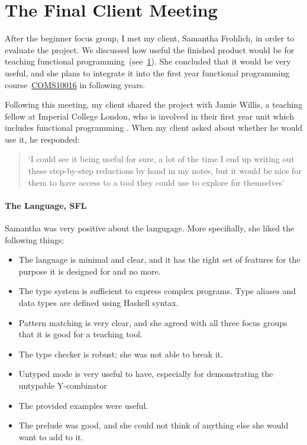 \section{The Final Client Meeting}
\label{c4:client}
After the beginner focus group, I met my client, Samantha Frohlich, in order to evaluate the project. We discussed how useful the finished product would be for teaching functional programming~(see~\ref{c4:client}). She concluded that it would be very useful, and she plans to integrate it into the first year functional programming course~\hyperref[COMS10016]{COMS10016} in following years. 

Following this meeting, my client shared the project with Jamie Willis, a teaching fellow at Imperial College London, who is involved in their first year unit which includes functional programming \cite{imperialFP}. When my client asked about whether he would use it, he responded:

\begin{quotation}
\noindent `I could see it being useful for sure, a lot of the time I end up writing out these step-by-step reductions by hand in my notes, but it would be nice for them to have access to a tool they could use to explore for themselves'
\end{quotation}

\paragraph{The Language, \ac{SFL}} 
Samantha was very positive about the langugage. More specifially, she liked the following things:

\begin{itemize}
    \item The language is minimal and clear, and it has the right set of features for the purpose it is designed for and no more.
    \item The type system is sufficient to express complex programs. Type aliases and data types are defined using Haskell syntax. 
    \item Pattern matching is very clear, and she agreed with all three focus groups that it is good for a teaching tool. 
    \item The type checker is robust; she was not able to break it. 
    \item Untyped mode is very useful to have, especially for demonstrating the untypable Y-combinator
    \item The provided examples were useful. 
    \item The prelude was good, and she could not think of anything else she would want to add to it. 
\end{itemize}

